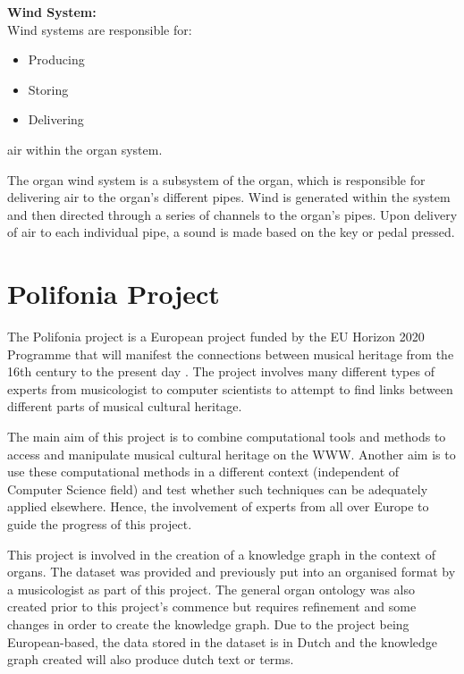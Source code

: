 \medskip
\noindent \textbf{Wind System:}
\\ Wind systems are responsible for:

\vspace{-0.15cm}
\begin{itemize}
    \itemsep0em 
\item Producing
\vspace{-0.1cm}
\item Storing
\vspace{-0.1cm}
\item Delivering
\end{itemize}
\vspace{-0.15cm}

\noindent air within the organ system.

The organ wind system is a subsystem of the organ, which is responsible for delivering air to the organ's different pipes. Wind is generated within the system and then directed through a series of channels to the organ's pipes. Upon delivery of air to each individual pipe, a sound is made based on the key or pedal pressed. \cite{organvideo}

\section{Polifonia Project}
\hspace{0.5cm} The Polifonia project is a European project funded by the EU Horizon 2020 Programme that will manifest the connections between musical heritage from the 16th century to the present day \cite{polifonia}. The project involves many different types of experts from musicologist to computer scientists to attempt to find links between different parts of musical cultural heritage. 

The main aim of this project is to combine computational tools and methods to access and manipulate musical cultural heritage on the WWW. Another aim is to use these computational methods in a different context (independent of Computer Science field) and test whether such techniques can be adequately applied elsewhere. Hence, the involvement of experts from all over Europe to guide the progress of this project. \cite{polifoniaproject}

This project is involved in the creation of a knowledge graph in the context of organs. The dataset was provided and previously put into an organised format by a musicologist as part of this project. The general organ ontology was also created prior to this project's commence but requires refinement and some changes in order to create the knowledge graph. Due to the project being European-based, the data stored in the dataset is in Dutch and the knowledge graph created will also produce dutch text or terms.  

